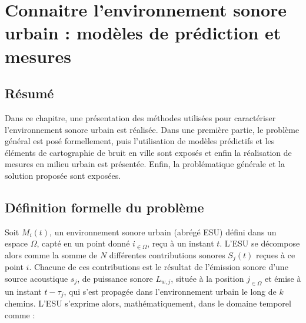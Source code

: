 \chapter{Connaitre l'environnement sonore urbain : modèles de prédiction et mesures}\label{chap:modele}
\thispagestyle{empty}

\section*{\centering Résumé}



\vspace{2cm}

Dans ce chapitre, une présentation des méthodes utilisées pour caractériser l'environnement sonore urbain est réalisée. Dans une première partie, le problème général est posé formellement, puis l'utilisation de modèles prédictifs et les éléments de cartographie de bruit en ville sont exposés et enfin la réalisation de mesures en milieu urbain est présentée. Enfin, la problématique générale et la solution proposée sont exposées.

\section{Définition formelle du problème}\label{part:problème}

Soit $M_{i}(t)$, un environnement sonore urbain (abrégé ESU) défini dans un espace $\Omega$, capté en un point donné $i_{\in \Omega}$, reçu à un instant $t$. L'ESU se décompose alors comme la somme de $N$ différentes contributions sonores $S_j(t)$ reçues à ce point $i$. Chacune de ces contributions est le résultat de l'émission sonore d'une source acoustique $s_j$, de puissance sonore $L_{w,j}$, située à la position $j_{\in \Omega}$ et émise à un instant $t-\tau_j$,  qui s'est propagée dans l'environnement urbain le long de $k$ chemins. L'ESU s'exprime alors, mathématiquement, dans le domaine temporel comme :

